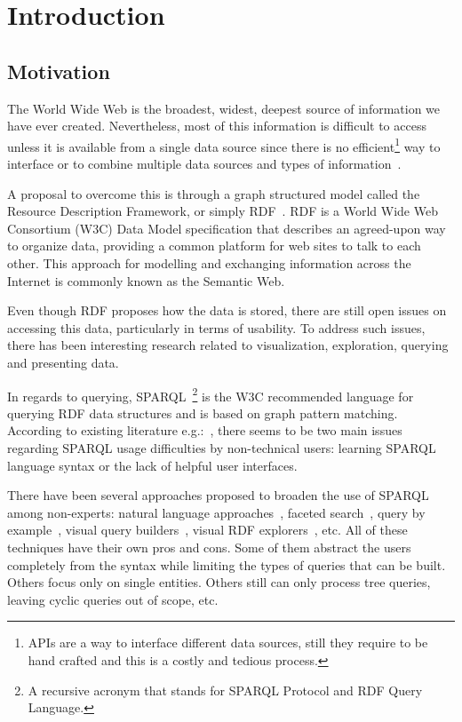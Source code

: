 \chapter{Introduction}

\section{Motivation}

The World Wide Web is the broadest, widest, deepest source of information we have ever created. 
Nevertheless, most of this information is difficult to access unless it is available from a single data source since there is no efficient\footnote{APIs are a way to interface different data sources, 
still they require to be hand crafted and this is a costly and tedious process.} way to interface or to combine multiple data sources and types of information~\cite{W3CDesignIssues}.

A proposal to overcome this is through a graph structured model called the Resource Description Framework, or simply RDF~\cite{rdfprimer11}. 
RDF is a World Wide Web Consortium (W3C) Data Model specification that describes an agreed-upon way to organize data, 
providing a common platform for web sites to talk to each other. 
This approach for modelling and exchanging information across the Internet is commonly known as the Semantic Web.

Even though RDF proposes how the data is stored, there are still open issues on accessing this data, particularly in terms of usability. 
To address such issues, there has been interesting research related to visualization, exploration, querying and presenting data.

In regards to querying, SPARQL~\cite{sparql11}\footnote{A recursive acronym that stands for SPARQL Protocol and RDF Query Language.} is the W3C recommended language for querying RDF data structures and is based on graph pattern matching. According to existing literature e.g.:~\cite{Ferre2016,Lehmann2014,Unger2014}, there seems to be two main issues regarding SPARQL usage difficulties by non-technical users: learning SPARQL language syntax or the lack of helpful user interfaces.

There have been several approaches proposed to broaden the use of SPARQL among non-experts: 
natural language approaches~\cite{Ngomo2013,Rico2015}, faceted search~\cite{Arenas2016,Moreno2018}, 
query by example~\cite{Clemmer2011,Diaz2016}, 
visual query builders~\cite{Dadzie2011,Vargas2019}, visual RDF explorers~\cite{Bikakis2016,Rietveld2016}, etc. 
All of these techniques have their own pros and cons. 
Some of them abstract the users completely from the syntax while limiting the types of queries that can be built. 
Others focus only on single entities. Others still can only process tree queries, leaving cyclic queries out of scope, etc. 

